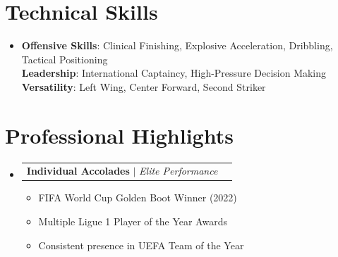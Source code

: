 \documentclass[letterpaper,11pt]{article}
\makeatletter
\newcommand{\resumeItem}[1]{\item\small{{#1 \vspace{-2pt}}}}
\newcommand{\resumeProjectHeading}[2]{
\item
\begin{tabular*}{0.97\textwidth}{l@{\extracolsep{\fill}}r}
\small#1 & #2 \\
\end{tabular*}\vspace{-7pt}}
\newcommand{\resumeSubHeadingListStart}{\begin{itemize}[leftmargin=0.15in, label={}]}
\newcommand{\resumeSubHeadingListEnd}{\end{itemize}}
\newcommand{\resumeItemListStart}{\begin{itemize}}
\newcommand{\resumeItemListEnd}{\end{itemize}\vspace{-5pt}}
\makeatother
\begin{document}
\section{Technical Skills}
\begin{itemize}[leftmargin=0.15in, label={}]
\item{
\textbf{Offensive Skills}{: Clinical Finishing, Explosive Acceleration, Dribbling, Tactical Positioning} \\
\textbf{Leadership}{: International Captaincy, High-Pressure Decision Making} \\
\textbf{Versatility}{: Left Wing, Center Forward, Second Striker}
}
\end{itemize}

\section{Professional Highlights}
\resumeSubHeadingListStart
\resumeProjectHeading{\textbf{Individual Accolades} $|$ \emph{Elite Performance}}{}
\resumeItemListStart
\resumeItem{FIFA World Cup Golden Boot Winner (2022)}
\resumeItem{Multiple Ligue 1 Player of the Year Awards}
\resumeItem{Consistent presence in UEFA Team of the Year}
\resumeItemListEnd
\resumeSubHeadingListEnd
\end{document}
